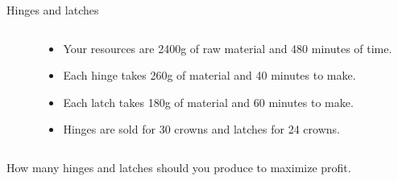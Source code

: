 \begin{frame}{Hinges and latches}
\begin{columns}
\begin{column}{0.4\linewidth}
 \end{column}
 \begin{column}{0.5\linewidth}
  \begin{itemize}
\pause\item Your resources are 2400g of raw material and 480 minutes of time.

\pause\item Each hinge takes 260g of material and 40 minutes to make.

\pause \item Each latch takes 180g of material and 60 minutes to make.

\pause \item Hinges are sold for 30 crowns and latches for 24 crowns.
  \end{itemize}
 \end{column}
\end{columns}
\pause \vspace{20pt}

How many hinges and latches should you produce to maximize profit.

\end{frame}

